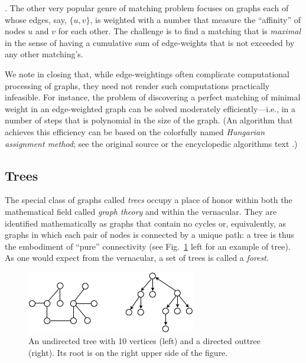 \bigskip

.
The other very popular genre of matching problem focuses on graphs
each of whose edges, say, $\{u,v\}$, is weighted with a number that
measure the ``affinity'' of  nodes $u$ and $v$ for each other.  The
challenge is to find a matching that is {\em maximal}
 in the sense of having a cumulative
sum of edge-weights that is not exceeded by any other matching's.

We note in closing that, while edge-weightings often complicate
computational processing of graphs, they need not render such
computations practically infeasible.  For instance, the problem of
discovering a perfect matching of minimal weight in an edge-weighted
graph can be solved moderately efficiently---i.e., in a number of
steps that is polynomial in the size of the graph.  (An algorithm that
achieves this efficiency can be based on the colorfully named {\it
  Hungarian assignment method};   see the
original source \cite{Kuhn55} or the encyclopedic algorithms text
\cite{CLRS}.)











\subsection{Trees}
\label{sec:Trees}

The special class of graphs called {\it trees} 
 occupy a place of honor within both the mathematical
field called {\it graph theory} and within the vernacular.
They are identified mathematically as graphs that contain no
cycles or, equivalently, as graphs in which each pair of nodes is
connected by a unique path: a tree is thus the embodiment of ``pure''
connectivity (see Fig.~\ref{fig:tree} left for an example of tree).  As one
would expect from the vernacular, a set of trees is called a {\it
  forest}. 
\begin{figure}[hbt]
\begin{center}
       \includegraphics[scale=0.6]{FiguresGraph/tree}
       \caption{An undirected tree with 10 vertices (left) and a directed outtree (right).
       Its root is on the right upper side of the figure.}
  \label{fig:tree}
\end{center}
\end{figure}

